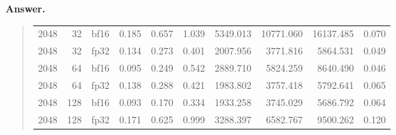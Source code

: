 \documentclass[11pt]{article}
\newenvironment{answer}{%
  \vspace{0.3em}%
  \noindent\textbf{Answer.}\begin{quote}%
}{%
  \end{quote}\vspace{0.4em}%
}
\begin{document}
\begin{answer}
\begin{table}[H]
{\begin{tabular}{@{}rrlrrrrrrr@{}}
    2048 & 32 & bf16 & 0.185 & 0.657 & 1.039 & 5349.013 & 10771.060 & 16137.485 & 0.070 \\
    2048 & 32 & fp32 & 0.134 & 0.273 & 0.401 & 2007.956 & 3771.816 & 5864.531 & 0.049 \\
    2048 & 64 & bf16 & 0.095 & 0.249 & 0.542 & 2889.710 & 5824.259 & 8640.490 & 0.046 \\
    2048 & 64 & fp32 & 0.138 & 0.288 & 0.421 & 1983.802 & 3757.418 & 5792.641 & 0.065 \\
    2048 & 128 & bf16 & 0.093 & 0.170 & 0.334 & 1933.258 & 3745.029 & 5686.792 & 0.064 \\
    2048 & 128 & fp32 & 0.171 & 0.625 & 0.999 & 3288.397 & 6582.767 & 9500.262 & 0.120 \\
    \bottomrule
    \end{tabular}
    }
    \end{table}


\end{answer}
\end{document}
